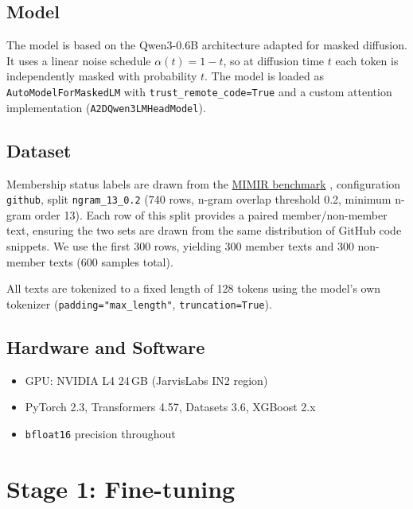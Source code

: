 \documentclass[11pt,a4paper]{article}
\begin{document}
\subsection{Model}

The model is based on the Qwen3-0.6B architecture adapted for masked diffusion.
It uses a linear noise schedule $\alpha(t) = 1 - t$, so at diffusion time $t$
each token is independently masked with probability $t$.
The model is loaded as \texttt{AutoModelForMaskedLM} with \texttt{trust\_remote\_code=True}
and a custom attention implementation (\texttt{A2DQwen3LMHeadModel}).

\subsection{Dataset}

Membership status labels are drawn from the
\href{https://huggingface.co/datasets/iamgroot42/mimir}{MIMIR benchmark}
\cite{mimir}, configuration \texttt{github}, split \texttt{ngram\_13\_0.2}
(740 rows, n-gram overlap threshold 0.2, minimum n-gram order 13).
Each row of this split provides a paired member/non-member text, ensuring
the two sets are drawn from the same distribution of GitHub code snippets.
We use the first 300 rows, yielding 300 member texts and 300 non-member texts
(600 samples total).

All texts are tokenized to a fixed length of 128 tokens using the model's
own tokenizer (\texttt{padding="max\_length"}, \texttt{truncation=True}).

\subsection{Hardware and Software}

\begin{itemize}
  \item GPU: NVIDIA L4 24\,GB (JarvisLabs IN2 region)
  \item PyTorch 2.3, Transformers 4.57, Datasets 3.6, XGBoost 2.x
  \item \texttt{bfloat16} precision throughout
\end{itemize}

\section{Stage 1: Fine-tuning}
\end{document}
